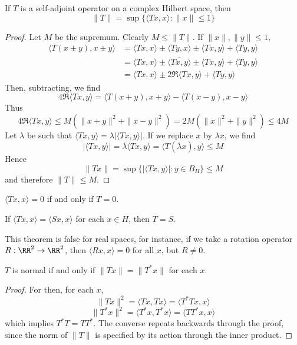\begin{theorem}
    If $T$ is a self-adjoint operator on a complex Hilbert space, then
    \[ \| T \| = \sup \{ \langle Tx, x \rangle: \| x \| \leq 1 \} \]
\end{theorem}
\begin{proof}
    Let $M$ be the supremum. Clearly $M \leq \| T \|$. If $\| x \|, \| y \| \leq 1$,
    \begin{align*}
        \langle T(x \pm y), x \pm y \rangle &= \langle Tx, x \rangle \pm \langle Ty, x \rangle \pm \langle Tx, y \rangle + \langle Ty, y \rangle\\
        &= \langle Tx, x \rangle \pm \overline{\langle Tx, y \rangle} \pm \langle Tx, y \rangle + \langle Ty, y \rangle\\
        &= \langle Tx, x \rangle \pm 2 \Re \langle Tx, y \rangle + \langle Ty, y \rangle
    \end{align*}
    Then, subtracting, we find
    \[ 4\Re \langle Tx, y \rangle = \langle T(x+y),x+y \rangle - \langle T(x - y), x - y \rangle \]
    Thus
    \[ 4 \Re \langle Tx, y \rangle \leq M(\|x + y\|^2 + \|x - y\|^2) = 2M(\|x\|^2 + \|y\|^2) \leq 4M \]
    Let $\lambda$ be such that $\langle Tx, y \rangle = \lambda |\langle Tx, y \rangle|$. If we replace $x$ by $\lambda x$, we find
    \[ |\langle Tx, y \rangle| = \overline{\lambda} \langle Tx, y \rangle = \langle T(\overline{\lambda}x), y \rangle \leq M \]
    Hence
    \[ \| Tx \| = \sup \{ |\langle Tx, y \rangle| : y \in B_H \} \leq M \]
    and therefore $\|T\| \leq M$.
\end{proof}

\begin{corollary}
    $\langle Tx, x \rangle = 0$ if and only if $T = 0$.
\end{corollary}
\begin{corollary}
    If $\langle Tx, x \rangle = \langle Sx, x \rangle$ for each $x \in H$, then $T = S$.
\end{corollary}

This theorem is false for real spaces, for instance, if we take a rotation operator $R: \RR^2 \to \RR^2$, then $\langle Rx, x \rangle = 0$ for all $x$, but $R \neq 0$.

\begin{theorem}
    $T$ is normal if and only if $\| Tx \| = \| T^* x \|$ for each $x$.
\end{theorem}
\begin{proof}
    For then, for each $x$,
    \[ \| Tx \|^2 = \langle Tx, Tx \rangle = \langle T^*Tx, x \rangle \]
    \[ \| T^*x \|^2 = \langle T^*x, T^*x \rangle = \langle TT^*x, x \rangle \]
    which implies $T^*T = TT^*$. The converse repeats backwards through the proof, since the norm of $\| T \|$ is specified by its action through the inner product.
\end{proof}

